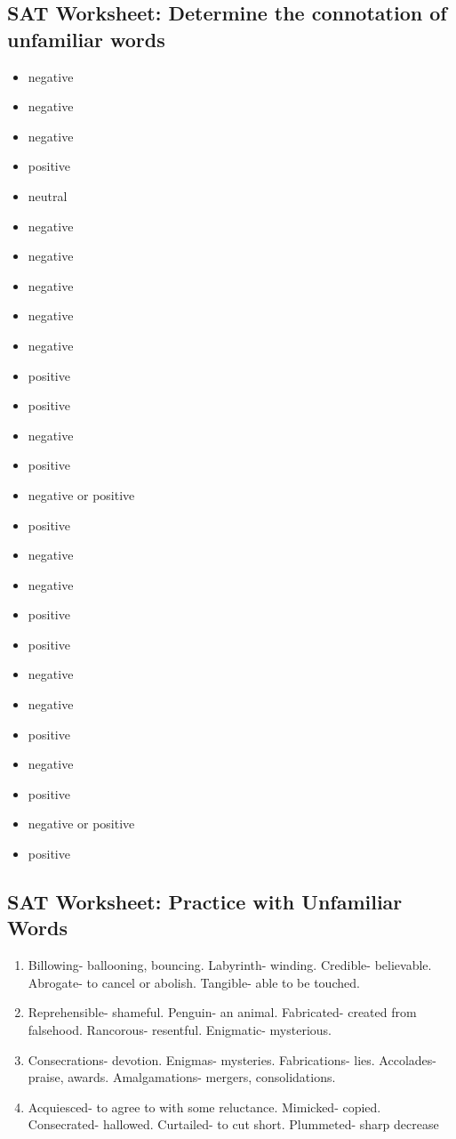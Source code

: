 \begin{enumerate}
\subsection{SAT Worksheet: Determine the connotation of unfamiliar words}

\begin{itemize}
\item negative
\item negative
\item negative
\item positive
\item neutral
\item negative
\item negative
\item negative
\item negative
\item negative
\item positive
\item positive
\item negative
\item positive
\item negative or positive
\item positive
\item negative
\item negative
\item positive
\item positive
\item negative
\item negative
\item positive
\item negative
\item positive
\item negative or positive
\item positive
\end{itemize}

\subsection{SAT Worksheet: Practice with Unfamiliar Words}

\begin{enumerate}
\item Billowing- ballooning, bouncing. Labyrinth- winding. Credible- believable. Abrogate- to cancel or abolish. Tangible- able to be touched.  
\item Reprehensible- shameful. Penguin- an animal. Fabricated- created from falsehood. Rancorous- resentful. Enigmatic- mysterious. 
\item Consecrations- devotion. Enigmas- mysteries. Fabrications- lies. Accolades- praise, awards. Amalgamations- mergers, consolidations.
\item Acquiesced- to agree to with some reluctance. Mimicked- copied. Consecrated- hallowed. Curtailed- to cut short. Plummeted- sharp decrease
\end{enumerate}


\end{enumerate}
